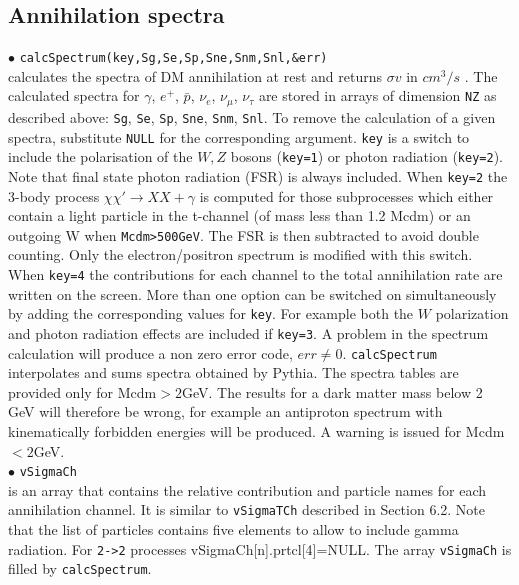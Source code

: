 \documentclass[12pt,a4paper]{article}
\begin{document}
\subsection{Annihilation spectra}
$\bullet$ \verb|calcSpectrum(key,Sg,Se,Sp,Sne,Snm,Snl,&err)|\\
calculates  the spectra  of DM annihilation 
at rest and returns $\sigma v$ in $cm^3/s$ . The calculated spectra
for $\gamma$, $e^+$, $\bar{p}$, $\nu_e$, $\nu_{\mu}$, $\nu_{\tau}$ 
are stored in arrays of dimension \verb|NZ| as described above: \verb|Sg|, \verb|Se|, \verb|Sp|, \verb|Sne|, \verb|Snm|, \verb|Snl|. 
 To remove the calculation of a given spectra, substitute  
\verb|NULL| for the corresponding argument. 
\verb|key| is a switch to include the polarisation of the  $W,Z$ bosons (\verb|key=1|) or
 photon radiation (\verb|key=2|).  
 Note that final state photon radiation (FSR) is always included.
When \verb|key=2| the 3-body  process $\chi\chi'\rightarrow XX +\gamma$ is computed for those subprocesses which either contain a light particle in the t-channel (of mass less than 1.2 Mcdm) or an outgoing W when \verb|Mcdm>500GeV|. The FSR is then subtracted to avoid double counting.
Only the electron/positron spectrum is modified with this switch.
When \verb|key=4| the contributions  for each  channel to the total
annihilation rate  are written on the screen. More than one option
can be switched on simultaneously by adding the corresponding values for \verb|key|. 
For example both the $W$ polarization and photon radiation effects  are included if
\verb|key=3|.
A problem in the spectrum calculation will produce a non zero error code, $err\neq
0$. {\tt calcSpectrum} interpolates and sums spectra obtained
by Pythia. The spectra tables are provided only for Mcdm$>2$GeV. The results for a dark matter
mass below 2 GeV will therefore be wrong, for example an antiproton
spectrum  with  kinematically forbidden energies will be produced. A warning is issued for Mcdm$<2$GeV. \\ 
$\bullet$ \verb|vSigmaCh| \\
is an array that contains the relative contribution and particle names for each
annihilation channel. It is similar to  {\tt vSigmaTCh}
described in Section 6.2. Note that   the list of particles contains five elements to allow to include  gamma radiation. For \verb|2->2| processes vSigmaCh[n].prtcl[4]=NULL. The array {\tt vSigmaCh} is filled by 
{\tt calcSpectrum}. 
\end{document}
